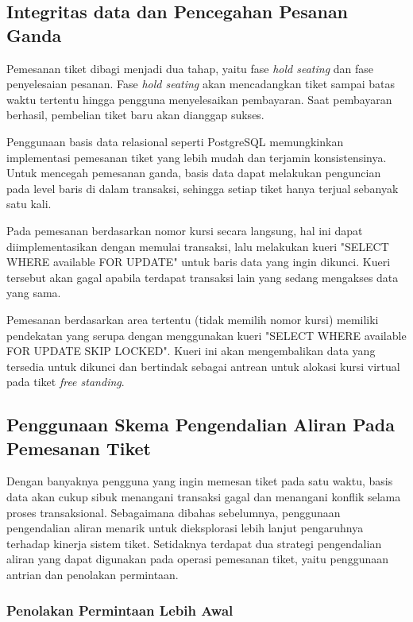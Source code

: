 \subsection{Integritas data dan Pencegahan Pesanan Ganda}

Pemesanan tiket dibagi menjadi dua tahap, yaitu fase \textit{hold seating} dan fase penyelesaian pesanan. Fase \textit{hold seating} akan mencadangkan tiket sampai batas waktu tertentu hingga pengguna menyelesaikan pembayaran. Saat pembayaran berhasil, pembelian tiket baru akan dianggap sukses.

Penggunaan basis data relasional seperti PostgreSQL memungkinkan implementasi pemesanan tiket yang lebih mudah dan terjamin konsistensinya. Untuk mencegah pemesanan ganda, basis data dapat melakukan penguncian pada level baris di dalam transaksi, sehingga setiap tiket hanya terjual sebanyak satu kali.

Pada pemesanan berdasarkan nomor kursi secara langsung, hal ini dapat diimplementasikan dengan memulai transaksi, lalu melakukan kueri "SELECT WHERE available FOR UPDATE" untuk baris data yang ingin dikunci. Kueri tersebut akan gagal apabila terdapat transaksi lain yang sedang mengakses data yang sama.

Pemesanan berdasarkan area tertentu (tidak memilih nomor kursi) memiliki pendekatan yang serupa dengan menggunakan kueri "SELECT WHERE available FOR UPDATE SKIP LOCKED". Kueri ini akan mengembalikan data yang tersedia untuk dikunci dan bertindak sebagai antrean untuk alokasi kursi virtual pada tiket \textit{free standing}.

\subsection{Penggunaan Skema Pengendalian Aliran Pada Pemesanan Tiket}

Dengan banyaknya pengguna yang ingin memesan tiket pada satu waktu, basis data akan cukup sibuk menangani transaksi gagal dan menangani konflik selama proses transaksional. Sebagaimana dibahas sebelumnya, penggunaan pengendalian aliran menarik untuk dieksplorasi lebih lanjut pengaruhnya terhadap kinerja sistem tiket. Setidaknya terdapat dua strategi pengendalian aliran yang dapat digunakan pada operasi pemesanan tiket, yaitu penggunaan antrian dan penolakan permintaan.

\subsubsection{Penolakan Permintaan Lebih Awal}

